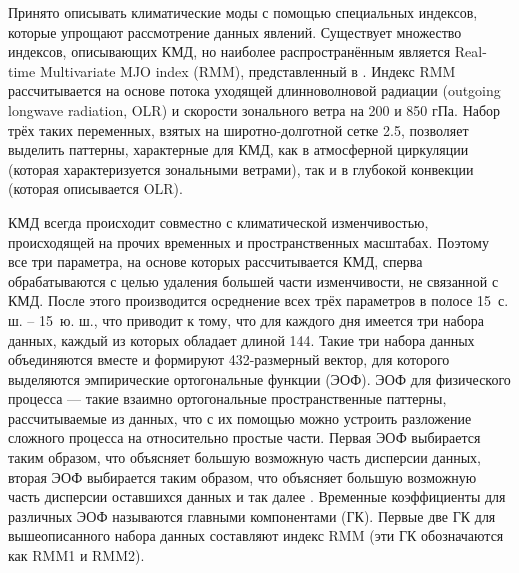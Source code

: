 
Принято описывать климатические моды с помощью специальных индексов, которые упрощают рассмотрение данных явлений. Существует множество индексов, описывающих КМД, но наиболее распространённым является Real-time Multivariate MJO index (RMM), представленный в \cite{Wheeler_Hendon_2004}. Индекс RMM рассчитывается на основе потока уходящей длинноволновой радиации (outgoing longwave radiation, OLR) и скорости зонального ветра на 200 и 850 гПа. Набор трёх таких переменных, взятых на широтно-долготной сетке 2.5\textdegree{}\textdegree, позволяет выделить паттерны, характерные для КМД, как в атмосферной циркуляции (которая характеризуется зональными ветрами), так и в глубокой конвекции (которая описывается OLR).

КМД всегда происходит совместно с климатической изменчивостью, происходящей на прочих временных и пространственных масштабах. Поэтому все три параметра, на основе которых рассчитывается КМД, сперва обрабатываются с целью удаления большей части изменчивости, не связанной с КМД. После этого производится осреднение всех трёх параметров в полосе 15\textdegree\ с. ш. – 15\textdegree\ ю. ш., что приводит к тому, что для каждого дня имеется три набора данных, каждый из которых обладает длиной 144. Такие три набора данных объединяются вместе и формируют 432-размерный вектор, для которого выделяются эмпирические ортогональные функции (ЭОФ). ЭОФ для физического процесса --- такие взаимно ортогональные пространственные паттерны, рассчитываемые из данных, что с их помощью можно устроить разложение сложного процесса на относительно простые части. Первая ЭОФ выбирается таким образом, что объясняет большую возможную часть дисперсии данных, вторая ЭОФ выбирается таким образом, что объясняет большую возможную часть дисперсии оставшихся данных и так далее \cite[Гл. 6]{Zhang_et_al_2020}. Временные коэффициенты для различных ЭОФ называются главными компонентами (ГК). Первые две ГК для вышеописанного набора данных составляют индекс RMM (эти ГК обозначаются как RMM1 и RMM2).

